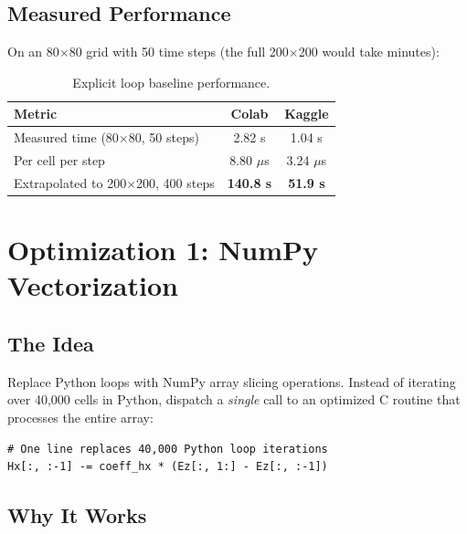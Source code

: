 \documentclass[11pt,a4paper]{article}
\begin{document}
\subsection{Measured Performance}

On an 80$\times$80 grid with 50 time steps (the full 200$\times$200 would take minutes):

\begin{table}[H]
\centering
\begin{tabular}{@{}lcc@{}}
\toprule
\textbf{Metric} & \textbf{Colab} & \textbf{Kaggle} \\
\midrule
Measured time (80$\times$80, 50 steps) & 2.82 s & 1.04 s \\
Per cell per step & 8.80 $\mu$s & 3.24 $\mu$s \\
Extrapolated to 200$\times$200, 400 steps & \textbf{140.8 s} & \textbf{51.9 s} \\
\bottomrule
\end{tabular}
\caption{Explicit loop baseline performance.}
\end{table}


\section{Optimization 1: NumPy Vectorization}

\subsection{The Idea}

Replace Python loops with NumPy array slicing operations. Instead of iterating over 40,000 cells in Python, dispatch a \emph{single} call to an optimized C routine that processes the entire array:

\begin{lstlisting}[caption={H-field update --- NumPy vectorized}]
# One line replaces 40,000 Python loop iterations
Hx[:, :-1] -= coeff_hx * (Ez[:, 1:] - Ez[:, :-1])
\end{lstlisting}

\subsection{Why It Works}
\end{document}
